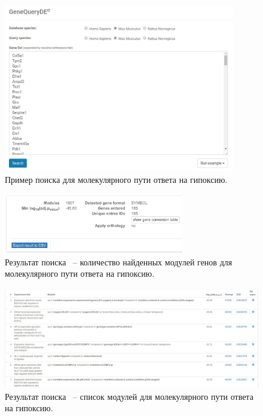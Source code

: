 \documentclass[times,specification,annotation]{itmo-student-thesis}
\begin{document}
\begin{figure}[!h]
    \caption{Пример поиска для молекулярного пути ответа на гипоксию.}\label{clientRequest}
    \centering
    \includegraphics[width=0.9\textwidth]{request.jpg}
\end{figure}

\begin{figure}[!h]
    \caption{Результат поиска ~-- количество найденных модулей генов для молекулярного пути ответа на гипоксию.}\label{clientResponseShort}
    \centering
    \includegraphics[width=0.7\textwidth]{responseModulesNumber}
\end{figure}

\begin{figure}[!h]
    \caption{Результат поиска ~-- список модулей для молекулярного пути ответа на гипоксию.}\label{clientResponseTable}
    \centering
    \includegraphics[width=1\textwidth]{responseModulesList.jpg}
\end{figure}
\end{document}
